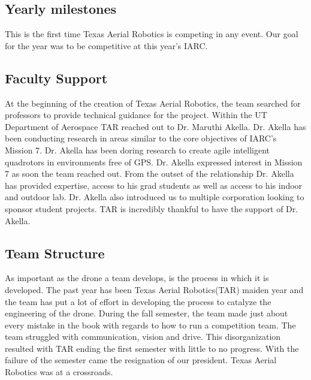 \documentclass[12pt]{article}
\begin{document}
\subsection{Yearly milestones}
This is the first time Texas Aerial Robotics is competing in any event. Our goal for the year was to be competitive at this year's IARC. 

\subsection{Faculty Support}
At the beginning of the creation of Texas Aerial Robotics, the team searched for professors to provide technical guidance for the project. Within the UT Department of Aerospace TAR reached out to Dr. Maruthi Akella. Dr. Akella has been conducting research in areas similar to the core objectives of IARC’s Mission 7. Dr. Akella has been doring research to create agile intelligent quadrotors in environments free of GPS. Dr. Akella expressed interest in Mission 7 as soon the team reached out. From the outset of the relationship Dr. Akella has provided expertise, access to his grad students as well as access to his indoor and outdoor lab. Dr. Akella also introduced us to multiple corporation looking to sponsor student projects. TAR is incredibly thankful to have the support of Dr. Akella. 

\subsection{Team Structure}
As important as the drone a team develops, is the process in which it is developed. The past year has been Texas Aerial Robotics(TAR) maiden year and the team has put a lot of effort in developing the process to catalyze the engineering of the drone. During the fall semester, the team made just about every mistake in the book with regards to how to run a competition team. The team struggled with communication, vision and drive. This disorganization resulted with TAR ending the first semester with little to no progress. With the failure of the semester came the resignation of our president. Texas Aerial Robotics was at a crossroads. 
\end{document}
